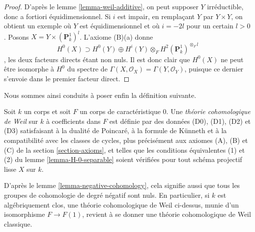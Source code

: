 \begin{proof}
D'après le lemme \ref{lemma-weil-additive}, on peut supposer $Y$ irréductible,
donc a fortiori équidimensionnel. Si $i$ est impair, en remplaçant
$Y$ par $Y \times Y$, on obtient un exemple où $Y$ est équidimensionnel
et où $i = -2l$ pour un certain $l > 0$. Posons $X = Y \times (\mathbf{P}^1_k)^l$.
L'axiome (B)(a) donne
$$
H^0(X) \supset H^0(Y) \oplus
H^i(Y) \otimes_F H^2(\mathbf{P}^1_k)^{\otimes_F l}
$$,
les deux facteurs directs étant non nuls. Il est donc clair que $H^0(X)$ ne peut être
isomorphe à $H^0$ du spectre de
$\Gamma(X, \mathcal{O}_X) = \Gamma(Y, \mathcal{O}_Y)$,
puisque ce dernier s'envoie dans le premier facteur direct.
\end{proof}

\noindent
Nous sommes ainsi conduits à poser enfin la définition suivante.

\begin{definition}
\label{definition-weil-cohomology-theory}
Soit $k$ un corps et soit $F$ un corps de caractéristique $0$.
Une {\it théorie cohomologique de Weil} sur $k$ à coefficients dans $F$
est définie par des données (D0), (D1), (D2) et (D3) satisfaisant
à la dualité de Poincar\'e, à la formule de K\"unneth et à la compatibilité
avec les classes de cycles, plus précisément aux axiomes (A), (B) et (C)
de la section \ref{section-axioms},
et telles que les conditions équivalentes (1) et (2) du
lemme \ref{lemma-H-0-separable} soient vérifiées pour tout schéma projectif lisse $X$ sur $k$.
\end{definition}

\noindent
D'après le lemme \ref{lemma-negative-cohomology}, cela signifie aussi que tous
les groupes de cohomologie de degré négatif sont nuls. En particulier, si $k$ est
algébriquement clos, une théorie cohomologique de Weil ci-dessus, munie d'un isomorphisme
$F \to F(1)$, revient à se donner une théorie cohomologique de Weil classique.


